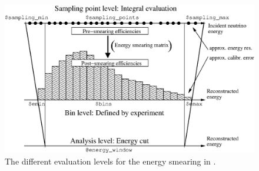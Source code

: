 \begin{figure}[t!]
\begin{center}
\includegraphics[width=15cm]{energies}
\end{center}
\caption{\label{fig:energies} The different evaluation levels for the energy smearing in \GLOBES .}
\end{figure}

